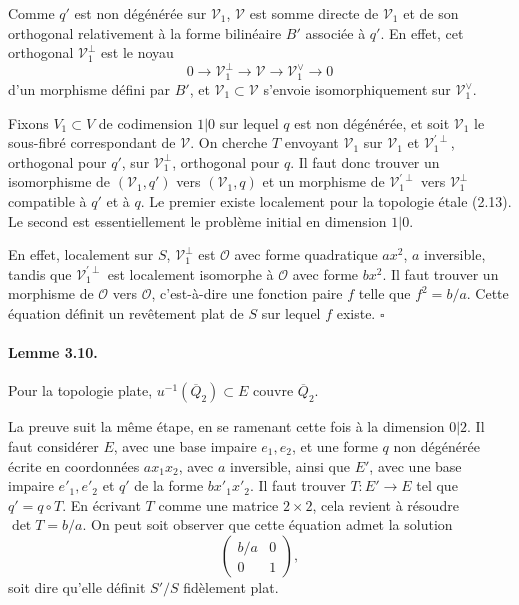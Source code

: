 \documentclass[11pt]{article}
\newcommand{\calO}{\mathcal O}
\newcommand{\barQ}{\overline Q}
\begin{document}
Comme $q'$ est non dégénérée sur $\mathcal V_1$, $\mathcal V$ est somme directe de $\mathcal V_1$ et de son orthogonal relativement à la forme bilinéaire $B'$ associée à $q'$. En effet, cet orthogonal $\mathcal V_1^\perp$ est le noyau
\[
0\longrightarrow \mathcal V_1^\perp\longrightarrow \mathcal V\longrightarrow \mathcal V_1^\vee\longrightarrow 0
\]
d'un morphisme défini par $B'$, et $\mathcal V_1\subset\mathcal V$ s'envoie isomorphiquement sur $\mathcal V_1^\vee$.

Fixons $V_1\subset V$ de codimension $1|0$ sur lequel $q$ est non dégénérée, et soit $\mathcal V_1$ le sous-fibré correspondant de $\mathcal V$. On cherche $T$ envoyant $\mathcal V_1$ sur $\mathcal V_1$ et $\mathcal V_1^{\prime\perp}$, orthogonal pour $q'$, sur $\mathcal V_1^\perp$, orthogonal pour $q$. Il faut donc trouver un isomorphisme de $(\mathcal V_1,q')$ vers $(\mathcal V_1,q)$ et un morphisme de $\mathcal V_1^{\prime\perp}$ vers $\mathcal V_1^\perp$ compatible à $q'$ et à $q$. Le premier existe localement pour la topologie étale (2.13). Le second est essentiellement le problème initial en dimension $1|0$.

En effet, localement sur $S$, $\mathcal V_1^\perp$ est $\calO$ avec forme quadratique $ax^2$, $a$ inversible, tandis que $\mathcal V_1^{\prime\perp}$ est localement isomorphe à $\calO$ avec forme $bx^2$. Il faut trouver un morphisme de $\calO$ vers $\calO$, c'est-à-dire une fonction paire $f$ telle que $f^2=b/a$. Cette équation définit un revêtement plat de $S$ sur lequel $f$ existe. \hfill $\square$

\paragraph{Lemme 3.10.}
Pour la topologie plate, $u^{-1}(\barQ_2)\subset E$ couvre $\barQ_2$.

La preuve suit la même étape, en se ramenant cette fois à la dimension $0|2$. Il faut considérer $E$, avec une base impaire $e_1,e_2$, et une forme $q$ non dégénérée écrite en coordonnées $ax_1x_2$, avec $a$ inversible, ainsi que $E'$, avec une base impaire $e'_1,e'_2$ et $q'$ de la forme $bx'_1x'_2$. Il faut trouver $T:E'\to E$ tel que $q'=q\circ T$. En écrivant $T$ comme une matrice $2\times2$, cela revient à résoudre $\det T=b/a$. On peut soit observer que cette équation admet la solution
\[
\begin{pmatrix}b/a&0\\0&1\end{pmatrix},
\]
soit dire qu'elle définit $S'/S$ fidèlement plat.
\end{document}
